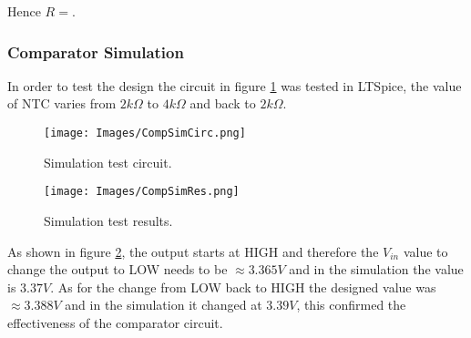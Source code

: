 Hence $R = $.

\subsubsection{Comparator Simulation}

In order to test the design the circuit in figure \ref{fig:TestCirc} was tested in LTSpice, the value of NTC varies from $2k\Omega$ to $4k\Omega$ and back to $2k\Omega$.

\begin{figure}[H]
    \centering
    \texttt{[image: Images/CompSimCirc.png]}
    \caption{Simulation test circuit.}
    \label{fig:TestCirc}
\end{figure}

\begin{figure}[H]
    \centering
    \texttt{[image: Images/CompSimRes.png]}
    \caption{Simulation test results.}
    \label{fig:TestRes}
\end{figure}

As shown in figure \ref{fig:TestRes}, the output starts at HIGH and therefore the $V_{in}$ value to change the output to LOW needs to be $\approx 3.365V$ and in the simulation the value is $3.37V$. As for the change from LOW back to HIGH the designed value was $\approx 3.388V$ and in the simulation it changed at $3.39V$, this confirmed the effectiveness of the comparator circuit.


